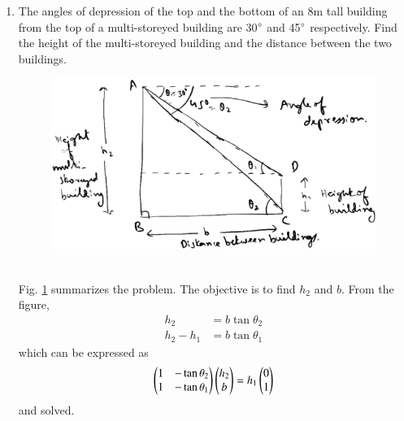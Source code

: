 \begin{enumerate}[label=\arabic*.,ref=\thesubsection.\theenumi]
%
\item The angles of depression of the top and the bottom of an 8m tall building from the top of a multi-storeyed building are 30$\degree$ and 45$\degree$ respectively.  Find the height of the multi-storeyed building and the distance between the two buildings.
%
\begin{figure}[!ht]
\includegraphics[width=\columnwidth]{./triangle/figs/Trig/pg6.eps}
\caption{}
\label{fig:trig_pg6}
\end{figure}
%
\\
\solution Fig. \ref{fig:trig_pg6} summarizes the problem. The objective is to find $h_2$ and $b$.  From the figure, 
%
\begin{align}
h_2 &= b\tan \theta_2
\\
h_2-h_1 &= b\tan \theta_1
\end{align}
%
which can be expressed as
%
\begin{align}
\begin{pmatrix}
 1 & -\tan\theta_2 
\\
 1 & -\tan\theta_1
\end{pmatrix}\begin{pmatrix}h_2\\b\end{pmatrix}
= h_1\begin{pmatrix}0\\1\end{pmatrix}
\end{align}
%
and solved.
\end{enumerate}
%
